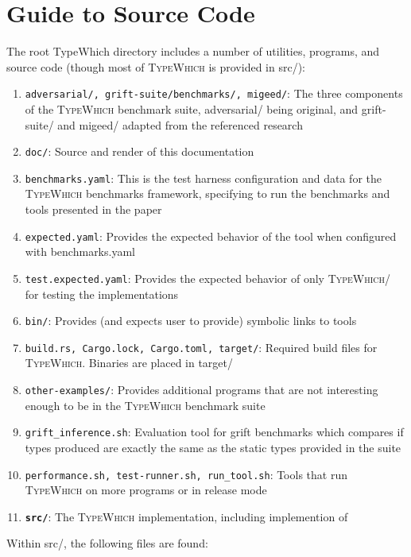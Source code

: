 \documentclass{book}
\newcommand{\system}{\textsc{TypeWhich}\xspace}
\begin{document}
\chapter{Guide to Source Code}

The root TypeWhich directory includes a number of utilities, programs, and
source code (though most of \system is provided in src/):

\begin{enumerate}
    \item \texttt{adversarial/, grift-suite/benchmarks/, migeed/}: The three
    components of the \system benchmark suite, adversarial/ being original, and
    grift-suite/ and migeed/ adapted from the referenced research
    \item \texttt{doc/}: Source and render of this documentation
    \item \texttt{benchmarks.yaml}: This is the test harness configuration and data
    for the \system benchmarks framework, specifying to run the benchmarks and
    tools presented in the paper
    \item \texttt{expected.yaml}: Provides the expected behavior of the tool when
    configured with benchmarks.yaml
    \item \texttt{test.expected.yaml}: Provides the expected behavior of only
    \system / \citet{rastogi:gti} for testing the implementations
    \item \texttt{bin/}: Provides (and expects user to provide) symbolic links to tools
    \item \texttt{build.rs, Cargo.lock, Cargo.toml, target/}: Required build files for
    \system. Binaries are placed in target/
    \item \texttt{other-examples/}: Provides additional programs that are not
    interesting enough to be in the \system benchmark suite
    \item \texttt{grift\_inference.sh}: Evaluation tool for grift benchmarks
    which compares if types produced are exactly the same as the static types
    provided in the suite
    \item \texttt{performance.sh, test-runner.sh, run\_tool.sh}: Tools that run
    \system on more programs or in release mode
    \item \textbf{\texttt{src/}}: The \system implementation, including implemention of
    \citet{rastogi:gti}
\end{enumerate}

Within src/, the following files are found:
\end{document}
